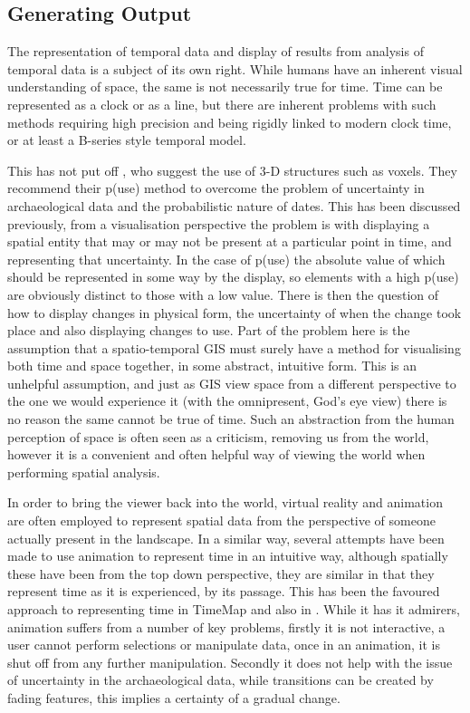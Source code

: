 \subsection{Generating Output}
The representation of temporal data and display of results from analysis of temporal data is a subject of its own right. While humans have an inherent visual understanding of space, the same is not necessarily true for time. Time can be represented as a clock or as a line, but there are inherent problems with such methods requiring high precision and being rigidly linked to modern clock time, or at least a B-series style temporal model. 

This has not put off \citet{lock2002analysing}, who suggest the use of 3-D structures such as voxels. They recommend their p(use) method to overcome the problem of uncertainty in archaeological data and the probabilistic nature of dates. This has been discussed previously, from a visualisation perspective the problem is with displaying a spatial entity that may or may not be present at a particular point in time, and representing that uncertainty. In the case of p(use) the absolute value of which should be represented in some way by the display, so elements with a high p(use) are obviously distinct to those with a low value. There is then the question of how to display changes in physical form, the uncertainty of when the change took place and also displaying changes to use. Part of the problem here is the assumption that a spatio-temporal GIS must surely have a method for visualising both time and space together, in some abstract, intuitive form. This is an unhelpful assumption, and just as GIS view space from a different perspective to the one we would experience it (with the omnipresent, God's eye view) there is no reason the same cannot be true of time. Such an abstraction from the human perception of space is often seen as a criticism, removing us from the world, however it is a convenient and often helpful way of viewing the world when performing spatial analysis.

In order to bring the viewer back into the world, virtual reality and animation are often employed to represent spatial data from the perspective of someone actually present in the landscape. In a similar way, several attempts have been made to use animation to represent time in an intuitive way, although spatially these have been from the top down perspective, they are similar in that they represent time as it is experienced, by its passage. This has been the favoured approach to representing time in TimeMap \citep{Johnson:2002kx} and also in \citet{Ceccarelli:2003fk}. While it has it admirers, animation suffers from a number of key problems, firstly it is not interactive, a user cannot perform selections or manipulate data, once in an animation, it is shut off from any further manipulation. Secondly it does not help with the issue of uncertainty in the archaeological data, while transitions can be created by fading features, this implies a certainty of a gradual change.

